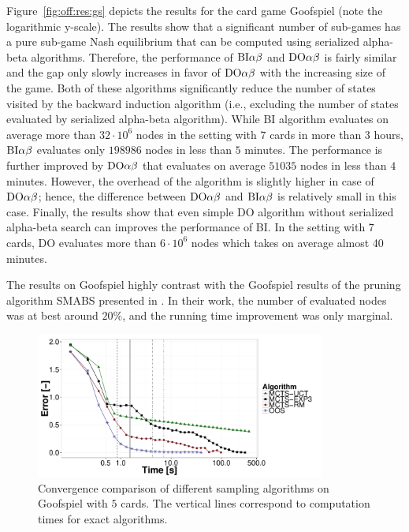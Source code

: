 Figure~\ref{fig:off:res:gs} depicts the results for the card game Goofspiel (note the logarithmic y-scale).
The results show that a significant number of sub-games has a pure sub-game Nash equilibrium that can be computed using serialized alpha-beta algorithms.
Therefore, the performance of $\textrm{BI}\alpha\beta$ and $\textrm{DO}\alpha\beta$ is fairly similar and the gap only slowly increases in favor of $\textrm{DO}\alpha\beta$ with the increasing size of the game.
Both of these algorithms significantly reduce the number of states visited by the backward induction algorithm (i.e., excluding the number of states evaluated by serialized alpha-beta algorithm).
While \textsc{BI} algorithm evaluates on average more than $32\cdot10^6$ nodes in the setting with $7$ cards in more than $3$ hours, $\textrm{BI}\alpha\beta$ evaluates only $198986$ nodes in less than $5$ minutes. 
The performance is further improved by $\textrm{DO}\alpha\beta$ that evaluates on average $51035$ nodes in less than $4$ minutes.
However, the overhead of the algorithm is slightly higher in case of $\textrm{DO}\alpha\beta$; hence, the difference between $\textrm{DO}\alpha\beta$ and $\textrm{BI}\alpha\beta$ is relatively small in this case.
Finally, the results show that even simple \textsc{DO} algorithm without serialized alpha-beta search can improves the performance of \textsc{BI}.
In the setting with $7$ cards, \textsc{DO} evaluates more than $6\cdot10^6$ nodes which takes on average almost 40 minutes.

The results on Goofspiel highly contrast with the Goofspiel results of the pruning algorithm SMABS presented in \cite{Saffidine12SMAB}.
In their work, the number of evaluated nodes was at best around $20\%$, and the running time improvement was only marginal. 

\begin{figure}
\centering
\includegraphics[width=0.85\textwidth]{figures/convergence-gs.pdf}
\caption{Convergence comparison of different sampling algorithms on Goofspiel with $5$ cards. The vertical lines correspond to computation times for exact algorithms.} \label{fig:off:conv:gs}
\end{figure}

